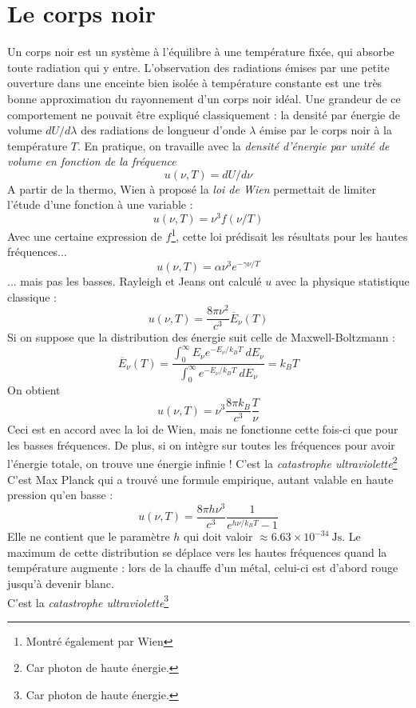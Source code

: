 \documentclass[british,french,11pt, a4paper, openany]{book}
\begin{document}
\section{Le corps noir}
Un corps noir est un système à l'équilibre à une température fixée, qui absorbe toute radiation qui y 
entre. L'observation des radiations émises par une petite ouverture dans une enceinte bien isolée à 
température constante est une très bonne approximation du rayonnement d'un corps noir idéal. Une 
grandeur de ce comportement ne pouvait être expliqué classiquement : la densité par énergie de volume 
$dU/d\lambda$ des radiations de longueur d'onde $\lambda$ émise par le corps noir à la température $T$.
En pratique, on travaille avec la \textit{densité d'énergie par unité de volume en fonction de la fréquence} 
\begin{equation}
	u(\nu,T) = dU/d\nu
\end{equation}
A partir de la thermo, Wien à proposé la \textit{loi de Wien} permettait de limiter l'étude d'une fonction
à une variable :
\begin{equation}
	u(\nu,T) = \nu^3f(\nu/T)
\end{equation}
Avec une certaine expression de $f$\footnote{Montré également par Wien}, cette loi prédisait les résultats 
pour les hautes fréquences...
\begin{equation}
	u(\nu,T) = \alpha \nu^3 e^{-\gamma\nu/T}
\end{equation}
... mais pas les basses. Rayleigh et Jeans ont calculé $u$ avec la physique statistique classique :
\begin{equation}
	u(\nu,T) = \dfrac{8\pi\nu^2}{c^3}\overline{E}_\nu(T)
	\label{eq:IdeePlanck}
\end{equation}
Si on suppose que la distribution des énergie suit celle de Maxwell-Boltzmann :
\begin{equation}
	\overline{E}_\nu(T) = \dfrac{\int_0^\infty E_\nu e^{-E_\nu/k_BT}\ dE_\nu}{\int_0^\infty
		e^{-E_\nu/k_BT}\ dE_\nu} = k_BT
	\label{eq:CalculEv}
\end{equation}
On obtient
\begin{equation}
	u(\nu,T) = \nu^3\dfrac{8\pi k_B}{c^3}\dfrac{T}{\nu}
\end{equation}
Ceci est en accord avec la loi de Wien, mais ne fonctionne cette fois-ci que pour les basses fréquences. De 
plus, si on intègre sur toutes les fréquences pour avoir l'énergie totale, on trouve une énergie infinie ! C'est la \textit{catastrophe ultraviolette}\footnote{Car photon de haute énergie.}\\
C'est Max Planck qui a trouvé une formule empirique, autant valable en haute pression qu'en basse :
\begin{equation}
	u(\nu,T) = \dfrac{8\pi h\nu^3}{c^3}\dfrac{1}{e^{h\nu/k_BT}-1}
	\label{eq:FormulePlanck}
\end{equation}
Elle ne contient que le paramètre $h$ qui doit valoir $\approx 6.63\times 10^{-34}\ \text{Js}$. Le maximum 
de cette distribution se déplace vers les hautes fréquences quand la température augmente : lors de la 
chauffe d'un métal, celui-ci est d'abord rouge jusqu'à devenir blanc.\\
C'est la \textit{catastrophe ultraviolette}\footnote{Car photon de haute énergie.}
\end{document}
